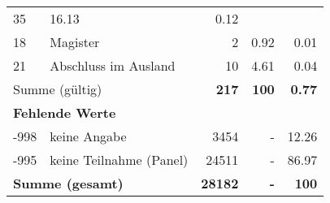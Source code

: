 \begin{longtable}{lXrrr}
       \num{35} &
       \num[round-mode=places,round-precision=2]{16.13} &
         \num[round-mode=places,round-precision=2]{0.12} \\

     18 &
     \multicolumn{1}{X}{ Magister   } &


       \num{2} &
       \num[round-mode=places,round-precision=2]{0.92} &
         \num[round-mode=places,round-precision=2]{0.01} \\

     21 &
     \multicolumn{1}{X}{ Abschluss im Ausland   } &


       \num{10} &
       \num[round-mode=places,round-precision=2]{4.61} &
         \num[round-mode=places,round-precision=2]{0.04} \\
     \midrule
     \multicolumn{2}{l}{Summe (gültig)} &
       \textbf{\num{217}} &
     \textbf{100} &
       \textbf{\num[round-mode=places,round-precision=2]{0.77}} \\
     \multicolumn{5}{l}{\textbf{Fehlende Werte}}\\
       -998 &
       keine Angabe &
         \num{3454} &
        - &
         \num[round-mode=places,round-precision=2]{12.26} \\
       -995 &
       keine Teilnahme (Panel) &
         \num{24511} &
        - &
         \num[round-mode=places,round-precision=2]{86.97} \\
     \midrule
     \multicolumn{2}{l}{\textbf{Summe (gesamt)}} &
          \textbf{\num{28182}} &
        \textbf{-} &
        \textbf{100} \\
     \bottomrule
     \end{longtable}
     
